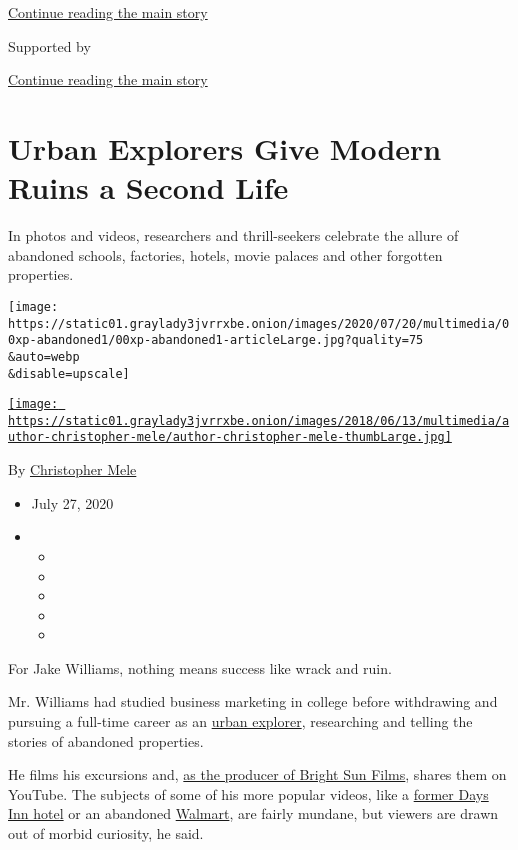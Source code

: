 \protect\hyperlink{after-top}{Continue reading the main story}

Supported by

\protect\hyperlink{after-sponsor}{Continue reading the main story}

\hypertarget{urban-explorers-give-modern-ruins-a-second-life}{%
\section{Urban Explorers Give Modern Ruins a Second
Life}\label{urban-explorers-give-modern-ruins-a-second-life}}

In photos and videos, researchers and thrill-seekers celebrate the
allure of abandoned schools, factories, hotels, movie palaces and other
forgotten properties.

\texttt{[image: https://static01.graylady3jvrrxbe.onion/images/2020/07/20/multimedia/00xp-abandoned1/00xp-abandoned1-articleLarge.jpg?quality=75\\\&auto=webp\\\&disable=upscale]}

\href{https://www.nytimes3xbfgragh.onion/by/christopher-mele}{\texttt{[image: https://static01.graylady3jvrrxbe.onion/images/2018/06/13/multimedia/author-christopher-mele/author-christopher-mele-thumbLarge.jpg]}}

By
\href{https://www.nytimes3xbfgragh.onion/by/christopher-mele}{Christopher
Mele}

\begin{itemize}
\item
  July 27, 2020
\item
  \begin{itemize}
  \item
  \item
  \item
  \item
  \item
  \end{itemize}
\end{itemize}

For Jake Williams, nothing means success like wrack and ruin.

Mr. Williams had studied business marketing in college before
withdrawing and pursuing a full-time career as an
\href{http://www.forbidden-places.net/why.php}{urban explorer},
researching and telling the stories of abandoned properties.

He films his excursions and,
\href{https://www.youtube.com/channel/UC5k3Kc0avyDJ2nG9Kxm9JmQ}{as the
producer of Bright Sun Films}, shares them on YouTube. The subjects of
some of his more popular videos, like a
\href{https://www.youtube.com/watch?v=3gJfEOx_NGA}{former Days Inn
hotel} or an abandoned
\href{https://www.youtube.com/watch?v=Mr1CWRc174o}{Walmart}, are fairly
mundane, but viewers are drawn out of morbid curiosity, he said.

